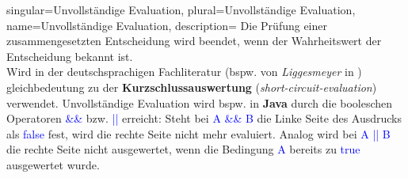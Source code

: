 {
singular={Unvollständige Evaluation},
plural={Unvollständige Evaluation},
name={Unvollständige Evaluation},
description={
Die Prüfung einer zusammengesetzten Entscheidung wird beendet, wenn der Wahrheitswert der Entscheidung bekannt ist.\\
Wird in der deutschsprachigen Fachliteratur (bspw. von \textit{Liggesmeyer} in \cite{Lig09}) gleichbedeutung zu der \textbf{Kurzschlussauswertung} (\textit{short-circuit-evaluation}) verwendet. Unvollständige Evaluation wird bspw. in \textbf{Java} durch die booleschen Operatoren \textcolor{blue}{\&\&} bzw. \textcolor{blue}{||} erreicht:
Steht bei \textcolor{blue}{A \&\& B} die Linke Seite des Ausdrucks als \textcolor{blue}{false} fest, wird die rechte Seite nicht mehr evaluiert. Analog wird bei \textcolor{blue}{A || B} die rechte Seite nicht ausgewertet, wenn die Bedingung \textcolor{blue}{A} bereits zu \textcolor{blue}{true} ausgewertet wurde.
}
}
